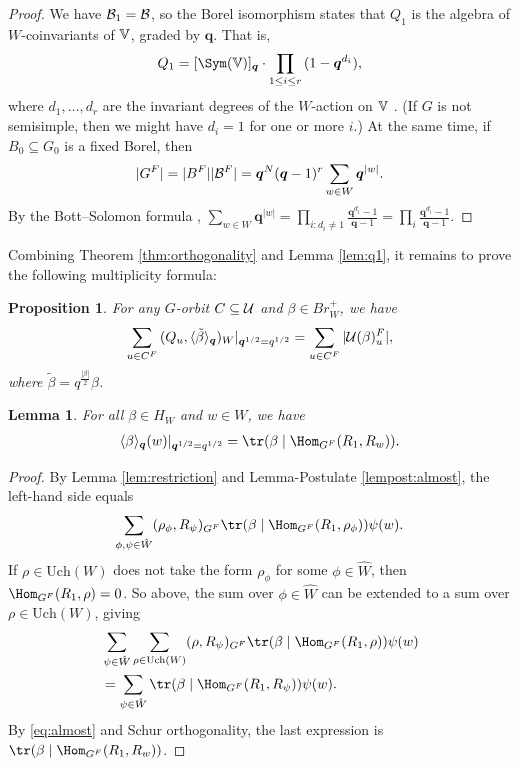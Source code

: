 \documentclass[a4paper,10pt,leqno]{amsart}
\theoremstyle{plain}
\theoremstyle{plain}
\theoremstyle{plain}
\newtheorem{lem}[thm]{Lemma}
\newtheorem{prop}[thm]{Proposition}
\theoremstyle{definition}
\theoremstyle{remark}
\newcommand{\Br}{\mathit{Br}}
\newcommand{\Q}{\bm{q}}
\newcommand{\UCh}{\mathrm{Uch}}
\newcommand{\Tr}[1]{\langle{#1}\rangle_{\Q}}
\begin{document}
\begin{proof}
We have $\cal{B}_1 = \cal{B}$, so the Borel isomorphism states that $Q_1$ is the algebra of $W$-coinvariants of $\bb{V}$, graded by $\Q$.
That is,
\begin{align}
Q_1 = [\Sym(\bb{V})]_{\Q} \cdot \prod_{1 \leq i \leq r} {(1 - \Q^{d_i})},
\end{align}
where $d_1, \ldots, d_r$ are the invariant degrees of the $W$-action on $\bb{V}$ \cite[149]{gp}.
(If $G$ is not semisimple, then we might have $d_i = 1$ for one or more $i$.)
At the same time, if $B_0 \subseteq G_0$ is a fixed Borel, then
\begin{align}
|G^F| = |B^F||\cal{B}^F| = \Q^N (\Q - 1)^r \sum_{w \in W} \Q^{|w|}.
\end{align}
By the Bott--Solomon formula \cite{solomon}, $\sum_{w \in W} \Q^{|w|} = \prod_{i : d_i \neq 1} \frac{\Q^{d_i} - 1}{\Q - 1} = \prod_i \frac{\Q^{d_i} - 1}{\Q - 1}$.
\end{proof}

Combining Theorem \ref{thm:orthogonality} and Lemma \ref{lem:q1}, it remains to prove the following multiplicity formula:

\begin{prop}\label{prop:multiplicity} 
For any $G$-orbit $C \subseteq \cal{U}$ and $\beta \in \Br_W^+$, we have
\begin{align}
\sum_{u \in C^F}
{(Q_u, \Tr{\tilde{\beta}})_W|_{\Q^{1/2} = q^{1/2}}}
= 
\sum_{u \in C^F}
|\cal{U}(\beta)_u^F|,
\end{align}
where $\tilde{\beta} = q^{\frac{|\beta|}{2}} \beta$.
\end{prop}

\begin{lem}\label{lem:reciprocity}
For all $\beta \in H_W$ and $w \in W$, we have 
\begin{align}
\Tr{\beta}(w)|_{\Q^{1/2} = q^{1/2}} = \tr(\beta \mid \Hom_{G^F}(R_1, R_w)).
\end{align}
\end{lem}

\begin{proof}
By Lemma \ref{lem:restriction} and Lemma-Postulate \ref{lempost:almost}, the left-hand side equals
\begin{align}
\sum_{\phi, \psi \in \hat{W}}
	(\rho_\phi, R_\psi)_{G^F} \tr(\beta \mid \Hom_{G^F}(R_1, \rho_\phi)) \psi(w).
\end{align}
If $\rho \in \UCh(W)$ does not take the form $\rho_\phi$ for some $\phi \in \hat{W}$, then $\Hom_{G^F}(R_1, \rho) = 0$.
So above, the sum over $\phi \in \hat{W}$ can be extended to a sum over $\rho \in \UCh(W)$, giving
\begin{align}\begin{split}
&\sum_{\psi \in \hat{W}} \sum_{\rho \in \UCh(W)}
(\rho, R_\psi)_{G^F} 
\tr(\beta \mid \Hom_{G^F}(R_1, \rho)) \psi(w)\\
&=	\sum_{\psi \in \hat{W}}
	\tr(\beta \mid \Hom_{G^F}(R_1, R_\psi)) \psi(w).
\end{split}\end{align}
By \eqref{eq:almost} and Schur orthogonality, the last expression is $\tr(\beta \mid \Hom_{G^F}(R_1, R_w))$.
\end{proof}
\end{document}
